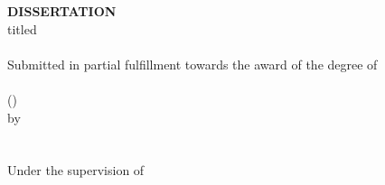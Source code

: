
\thispagestyle{empty}
\begin{center}
    \large {\textbf{\MakeUppercase{Dissertation}}}
    \\\vspace{10pt}
    \normalsize titled
    \\\vspace{10pt}
\Large
\textbf{\MakeUppercase{\Title{}}}
    \\\vspace{20pt}
    \normalsize Submitted in partial fulfillment towards the award of the degree of \\\vspace{17pt}
    \resizebox{0.7\linewidth}{!}{{{ {\CloisterBlack{}\Degree{}}}}}\\\vspace{10pt}
    \large(\MakeUppercase{\Subject{}})\\\vspace{10pt}
    \normalsize by
    \\\vspace{10pt}
    \large \textbf{\MakeUppercase{\Atitle{} \Author{}}\\ \MakeUppercase{\Rollno{}}}
\\\vspace{17pt}
    \normalsize Under the supervision of
\\\vspace{17pt}
\end{center}
